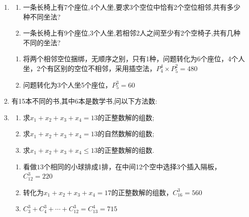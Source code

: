 \begin{enumerate}
\item 
\begin{enumerate}
    \item 一条长椅上有7个座位,4个人坐,要求3个空位中恰有2个空位相邻,共有多少种不同坐法?
    \item 一条长椅上有9个座位,3个人坐,若相邻2人之间至少有2个空椅子,共有几种不同的坐法?
\end{enumerate}
\begin{jieda}
    \begin{enumerate}
        \item 将两个相邻空位捆绑，无顺序之别，只有1种，问题转化为6个座位，4个人坐，2个有区别的空位不相邻，采用插空法，$P_4^4 \times P_5^2 = 480$
        \item 问题转化为3个人坐5个座位，$P_5^3 = 60$
    \end{enumerate}
\end{jieda}

\item 有15本不同的书,其中6本是数学书,问以下方法数:
\begin{jieda}
\end{jieda}

\item 
\begin{enumerate}
    \item 求$x_{1}+x_{2}+x_{3}+x_{4}=13$的正整数解的组数;
    \item 求$x_{1}+x_{2}+x_{3}+x_{4}=13$的自然数解的组数;
    \item 求$x_{1}+x_{2}+x_{3}+x_{4}\le13$的正整数解的组数.
\end{enumerate}
\begin{jieda}
    \begin{enumerate}
        \item 看做$13$个相同的小球排成1排，在中间12个空中选择$3$个插入隔板，$C_{12}^3 = 220$
        \item 转化为$x_{1}+x_{2}+x_{3}+x_{4}=17$的正整数解的组数，$C_{16}^3 = 560$
        \item $C_3^3 + C_4^3 + \cdots + C_{12}^3 = C_{13}^4 = 715$
    \end{enumerate}
\end{jieda}


\end{enumerate}

